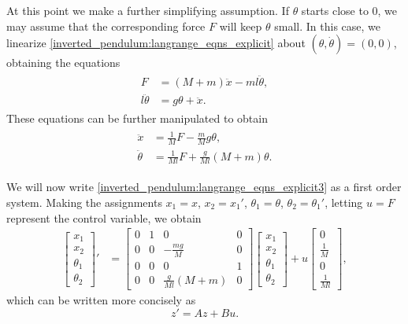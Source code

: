 At this point we make a further simplifying assumption. 
If $\theta$ starts close to $0$, we may assume that the corresponding force $F$ will keep $\theta$ small. 
In this case, we linearize \eqref{inverted_pendulum:langrange_eqns_explicit} about $(\theta, \dot{\theta}) = (0,0)$, obtaining the equations 
\begin{align*}
	\begin{split}
		F &= (M + m)\ddot{x} - ml\ddot{\theta},\\
		l \ddot{\theta} &= g \theta + \ddot{x}.
	\end{split}%
\end{align*}
These equations can be further manipulated 
to obtain 
\begin{align}
	\begin{split}
		\ddot{x} &= \frac{1}{M}F - \frac{m}{M}g\theta,\\
		\ddot{\theta} &= \frac{1}{Ml}F + \frac{g}{Ml} (M+m) \theta.
	\end{split}\label{inverted_pendulum:langrange_eqns_explicit3}
\end{align}

We will now write \eqref{inverted_pendulum:langrange_eqns_explicit3} as a first order system. 
Making the assignments $x_1 = x$, $x_2 = x_1'$, $\theta_1 = \theta$, $\theta_2 = \theta_1'$, letting $u = F$ represent the control variable, we obtain 
\begin{align*}
\begin{bmatrix}
x_1\\
x_2 \\
\theta_1 \\
\theta_2
\end{bmatrix}' &= 
\begin{bmatrix}
0 & 1 & 0 & 0\\
0 & 0 & -\frac{mg}{M} & 0 \\
0 & 0 & 0 & 1 \\
0 & 0 & \frac{g}{Ml}(M+m) & 0
\end{bmatrix}
\begin{bmatrix}
x_1\\
x_2 \\
\theta_1 \\
\theta_2
\end{bmatrix} + u
\begin{bmatrix}
0\\
\frac{1}{M} \\
0 \\
\frac{1}{Ml}
\end{bmatrix},
\end{align*}
which can be written more concisely as 
\[z' = Az + Bu.\]

